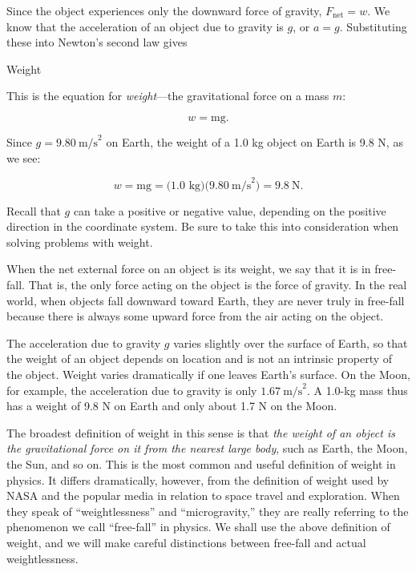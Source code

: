 \documentclass[
]{book}
\begin{document}
Since the object experiences only the downward force of gravity,
\({F_{\text{net}} = w}{}\). We know that the acceleration of an object due
to gravity is \(g{}\), or \({a = g}{}\). Substituting these into Newton's
second law gives

\hypertarget{fs-id1276219}{}
Weight

This is the equation for \emph{weight}---the gravitational force on a mass
\(m{}\):

\leavevmode{}%
\[{w = \text{mg}}.\]

Since \({{g =}9.80\ \text{m/s}^{2}}{}\) on Earth, the weight of a 1.0 kg
object on Earth is 9.8 N, as we see:

\leavevmode{}%
\[{{{w = \text{mg}} = (}1\text{.}\text{0\ kg})(9.80\ \text{m/s}^{2}{) = 9.8}\ \text{N}}.\]

Recall that \(g{}\) can take a positive or negative value, depending on
the positive direction in the coordinate system. Be sure to take this
into consideration when solving problems with weight.

When the net external force on an object is its weight, we say that it
is in \protect\hypertarget{import-auto-id1999571}{}{free-fall}. That is, the
only force acting on the object is the force of gravity. In the real
world, when objects fall downward toward Earth, they are never truly in
free-fall because there is always some upward force from the air acting
on the object.

The acceleration due to gravity \(g{}\)\emph{}
varies slightly over the surface of Earth, so that the weight of an
object depends on location and is not an intrinsic property of the
object. Weight varies dramatically if one leaves Earth's surface. On the
Moon, for example, the acceleration due to gravity is only
\({1.67\ \text{m/s}^{2}}{}\). A 1.0-kg mass thus has a weight of 9.8 N on
Earth and only about 1.7 N on the Moon.

The broadest definition of weight in this sense is that \emph{the weight of
an object is the gravitational force on it from the nearest large body},
such as Earth, the Moon, the Sun, and so on. This is the most common and
useful definition of weight in physics. It differs dramatically,
however, from the definition of weight used by NASA and the popular
media in relation to space travel and exploration. When they speak of
``weightlessness'' and ``microgravity,'' they are really referring to the
phenomenon we call ``free-fall'' in physics. We shall use the above
definition of weight, and we will make careful distinctions between
free-fall and actual weightlessness.
\end{document}
